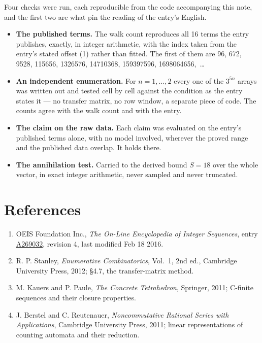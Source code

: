 \documentclass[11pt]{article}
\theoremstyle{definition}
\begin{document}
Four checks were run, each reproducible from the code accompanying this note, and the first two are what pin the reading of the entry's English.

\begin{itemize}

\item {\bfseries The published terms.} The walk count reproduces all 16 terms the entry publishes, exactly, in integer arithmetic, with the index taken from the entry's stated offset (1) rather than fitted. The first of them are 96, 672, 9528, 115656, 1326576, 14710368, 159397596, 1698064656,~\dots

\item {\bfseries An independent enumeration.} For $n = 1,\dots,2$ every one of the $3^{5n}$ arrays was written out and tested cell by cell against the condition as the entry states it --- no transfer matrix, no row window, a separate piece of code. The counts agree with the walk count and with the entry.

\item {\bfseries The claim on the raw data.} Each claim was evaluated on the entry's published terms alone, with no model involved, wherever the proved range and the published data overlap. It holds there.

\item {\bfseries The annihilation test.} Carried to the derived bound $S = 18$ over the whole vector, in exact integer arithmetic, never sampled and never truncated.

\end{itemize}

\section{References}

\begin{enumerate}

\item OEIS Foundation Inc., \emph{The On-Line Encyclopedia of Integer Sequences}, entry \href{https://oeis.org/A269032}{A269032}, revision 4, last modified Feb 18 2016.

\item R. P. Stanley, \emph{Enumerative Combinatorics}, Vol.~1, 2nd ed., Cambridge University Press, 2012; \S4.7, the transfer-matrix method.

\item M. Kauers and P. Paule, \emph{The Concrete Tetrahedron}, Springer, 2011; C-finite sequences and their closure properties.

\item J. Berstel and C. Reutenauer, \emph{Noncommutative Rational Series with Applications}, Cambridge University Press, 2011; linear representations of counting automata and their reduction.

\end{enumerate}
\end{document}

